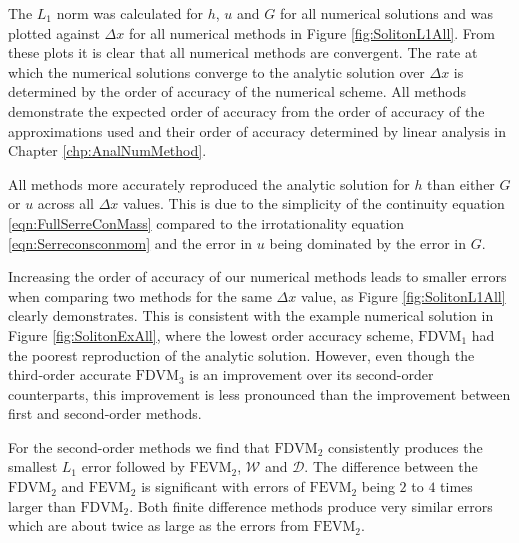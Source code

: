 The $L_1$ norm was calculated for $h$, $u$ and $G$ for all numerical solutions and was plotted against $\Delta x$ for all numerical methods in Figure \ref{fig:SolitonL1All}. From these plots it is clear that all numerical methods are convergent. The rate at which the numerical solutions converge to the analytic solution over $\Delta x$ is determined by the order of accuracy of the numerical scheme. All methods demonstrate the expected order of accuracy from the order of accuracy of the approximations used and their order of accuracy determined by linear analysis in Chapter \ref{chp:AnalNumMethod}.  

All methods more accurately reproduced the analytic solution for $h$ than either $G$ or $u$ across all $\Delta x$ values. This is due to the simplicity of the continuity equation \eqref{eqn:FullSerreConMass} compared to the irrotationality equation \eqref{eqn:Serreconsconmom} and the error in $u$ being dominated by the error in $G$. 

Increasing the order of accuracy of our numerical methods leads to smaller errors when comparing two methods for the same $\Delta x$ value, as Figure \ref{fig:SolitonL1All} clearly demonstrates. This is consistent with the example numerical solution in Figure \ref{fig:SolitonExAll}, where the lowest order accuracy scheme, $\text{FDVM}_1$ had the poorest reproduction of the analytic solution. However, even though the third-order accurate $\text{FDVM}_3$ is an improvement over its second-order counterparts, this improvement is less pronounced than the improvement between first and second-order methods.

For the second-order methods we find that $\text{FDVM}_2$ consistently produces the smallest $L_1$ error followed by $\text{FEVM}_2$, $\mathcal{W}$ and $\mathcal{D}$. The difference between the $\text{FDVM}_2$ and $\text{FEVM}_2$ is significant with errors of $\text{FEVM}_2$ being $2$ to $4$ times larger than $\text{FDVM}_2$. Both finite difference methods produce very similar errors which are about twice as large as the errors from $\text{FEVM}_2$. 

